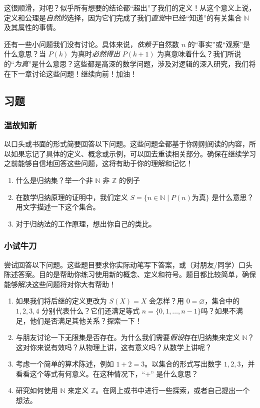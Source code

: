 这很顺滑，对吧？似乎所有想要的结论都“超出”了我们的定义！从这个意义上说，定义和公理是\emph{自然的}选择，因为它们完成了我们\emph{直觉}中已经``知道''的有关集合 $\mathbb{N}$ 及其属性的事情。

还有一些小问题我们没有讨论。具体来说，\emph{依赖于}自然数 $n$ 的``事实''或``观察''是什么意思？当 $P(k)$ 为真时\emph{必然得出} $P(k + 1)$ 为真意味着什么？我们所说的``\emph{为真}''是什么意思？这些都是高深的数学问题，涉及对逻辑的深入研究，我们将在下一章讨论这些问题！继续向前！加油！

\subsection{习题}

\subsubsection*{温故知新}

以口头或书面的形式简要回答以下问题。这些问题全都基于你刚刚阅读的内容，所以如果忘记了具体的定义、概念或示例，可以回去重读相关部分。确保在继续学习之前能够自信地回答这些问题，这将有助于你的理解和记忆！

\begin{enumerate}[label=(\arabic*)]
    \item 什么是归纳集？举一个非 $\mathbb{N}$ 非 $\mathbb{Z}$ 的例子
    \item 在数学归纳原理的证明中，我们定义 $S = \{n \in \mathbb{N} \mid P(n) \text{为真}\}$ 是什么意思？用文字描述一下这个集合。
    \item 对于归纳法的工作原理，想出你自己的类比。
\end{enumerate}

\subsubsection*{小试牛刀}

尝试回答以下问题。这些题目要求你实际动笔写下答案，或（对朋友/同学）口头陈述答案。目的是帮助你练习使用新的概念、定义和符号。题目都比较简单，确保能够解决这些问题将对你大有帮助！

\begin{enumerate}[label=(\arabic*)]
    \item 如果我们将后继的定义更改为 $S(X) = {X}$ 会怎样？用 $0 = \varnothing$，集合中的 $1,2,3,4$ 分别代表什么？它们还满足等式 $n = \{0, 1, \dots, n - 1\}$吗？如果不满足，他们是否满足其他关系？探索一下！
    \item 与朋友讨论一下无限集是否存在。为什么我们需要\emph{假设}存在归纳集来定义 $\mathbb{N}$？这对你来说有效吗？从物理上讲，这有意义吗？从数学上讲呢？
    \item 考虑一个简单的算术陈述，例如 $1 + 2 = 3$。以集合的形式写出数字 $1,2,3$，并看看这个等式有何意义。在这种情况下，``$+$'' 是什么意思？
    \item 研究如何使用 $\mathbb{N}$ 来定义 $\mathbb{Z}$。在网上或书中进行一些探索，或者自己提出一个想法。
\end{enumerate}